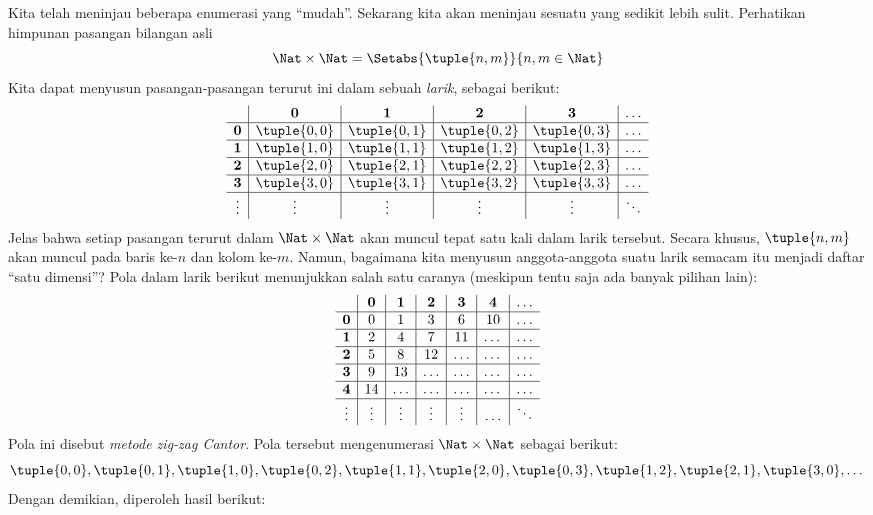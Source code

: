 \documentclass[../../../include/open-logic-section]{subfiles}
\begin{document}


\begin{explain}
Kita telah meninjau beberapa enumerasi yang ``mudah''. Sekarang kita akan
meninjau sesuatu yang sedikit lebih sulit. Perhatikan himpunan pasangan
bilangan asli
\[
\Nat \times \Nat = \Setabs{\tuple{n,m}}{n,m \in \Nat}
\]
Kita dapat menyusun pasangan-pasangan terurut ini dalam sebuah \emph{larik},
sebagai berikut:
\[
\begin{array}{ c | c | c | c | c | c}
& \mathbf 0 & \mathbf 1 & \mathbf 2 & \mathbf 3 & \dots \\
\hline
\mathbf 0 & \tuple{0,0} & \tuple{0,1} & \tuple{0,2} & \tuple{0,3} & \dots \\
\hline
\mathbf 1 & \tuple{1,0} & \tuple{1,1} & \tuple{1,2} & \tuple{1,3} & \dots \\
\hline
\mathbf 2 & \tuple{2,0} & \tuple{2,1} & \tuple{2,2} & \tuple{2,3} & \dots \\
\hline
\mathbf 3 & \tuple{3,0} & \tuple{3,1} & \tuple{3,2} & \tuple{3,3} & \dots \\
\hline
\vdots & \vdots & \vdots & \vdots & \vdots & \ddots\\
\end{array}
\]
Jelas bahwa setiap pasangan terurut dalam $\Nat \times \Nat$ akan muncul
tepat satu kali dalam larik tersebut. Secara khusus, $\tuple{n,m}$ akan muncul
pada baris ke-$n$ dan kolom ke-$m$. Namun, bagaimana kita menyusun
anggota-anggota suatu larik semacam itu menjadi daftar ``satu dimensi''? Pola
dalam larik berikut menunjukkan salah satu caranya (meskipun tentu saja ada
banyak pilihan lain):
\[
\begin{array}{ c | c | c | c | c | c | c}
& \mathbf 0 & \mathbf 1 & \mathbf 2 & \mathbf 3 & \mathbf 4 &\dots \\
\hline
\mathbf 0 & 0  & 1& 3 & 6& 10 &\ldots \\
\hline
\mathbf 1 &2 & 4& 7 & 11 & \dots &\ldots \\
\hline
\mathbf 2 & 5 & 8 & 12 & \ldots & \dots&\ldots \\
\hline
\mathbf 3 & 9 & 13 & \ldots & \ldots & \dots & \ldots \\
\hline
\mathbf 4 & 14 & \ldots & \ldots & \ldots & \dots & \ldots \\
\hline
\vdots & \vdots & \vdots & \vdots & \vdots&\ldots & \ddots\\
\end{array}
\]\noindent
Pola ini disebut \emph{metode zig-zag Cantor}. Pola tersebut mengenumerasi
$\Nat \times \Nat$ sebagai berikut:
\[
\tuple{0,0}, \tuple{0,1}, \tuple{1,0}, \tuple{0,2}, \tuple{1,1},
\tuple{2,0}, \tuple{0,3}, \tuple{1,2}, \tuple{2,1}, \tuple{3,0}, \dots
\]
Dengan demikian, diperoleh hasil berikut:
\end{explain}
\end{document}
